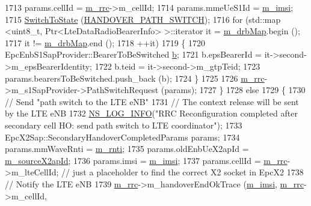 \begin{DoxyCode}
1713           params.cellId = \hyperlink{classns3_1_1UeManager_ab4405e9f354c66e7c1a4c95832290f5b}{m\_rrc}->m\_cellId;
1714           params.mmeUeS1Id = \hyperlink{classns3_1_1UeManager_a868dda076ecfc1d4202e357c16223d84}{m\_imsi};
1715           \hyperlink{classns3_1_1UeManager_af2b5ad90fc6f16ffc4a91fbe8a522472}{SwitchToState} (\hyperlink{classns3_1_1UeManager_a2f4085fdd18d7125c27da44a5b8b6808a66ee8994a912a463763b439ac0f158f2}{HANDOVER\_PATH\_SWITCH});
1716           \textcolor{keywordflow}{for} (std::map <uint8\_t, Ptr<LteDataRadioBearerInfo> >::iterator it =  
      \hyperlink{classns3_1_1UeManager_a18499c025730b63c73e5d93effff57aa}{m\_drbMap}.begin ();
1717              it != \hyperlink{classns3_1_1UeManager_a18499c025730b63c73e5d93effff57aa}{m\_drbMap}.end ();
1718              ++it)
1719           \{
1720             EpcEnbS1SapProvider::BearerToBeSwitched \hyperlink{buildings__pathloss_8m_a21ad0bd836b90d08f4cf640b4c298e7c}{b};
1721             b.epsBearerId = it->second->m\_epsBearerIdentity;
1722             b.teid =  it->second->m\_gtpTeid;
1723             params.bearersToBeSwitched.push\_back (b);
1724           \}
1725         
1726           \hyperlink{classns3_1_1UeManager_ab4405e9f354c66e7c1a4c95832290f5b}{m\_rrc}->m\_s1SapProvider->PathSwitchRequest (params);
1727         \}
1728         \textcolor{keywordflow}{else}
1729         \{
1730           \textcolor{comment}{// Send "path switch to the LTE eNB"}
1731           \textcolor{comment}{// The context release will be sent by the LTE eNB}
1732           \hyperlink{group__logging_gafbd73ee2cf9f26b319f49086d8e860fb}{NS\_LOG\_INFO}(\textcolor{stringliteral}{"RRC Reconfiguration completed after secondary cell HO: send path switch
       to LTE coordinator"});
1733           EpcX2Sap::SecondaryHandoverCompletedParams params;
1734           params.mmWaveRnti = \hyperlink{classns3_1_1UeManager_a5a72b4fe818f21993bd7f05d7e2c4f83}{m\_rnti};
1735           params.oldEnbUeX2apId = \hyperlink{classns3_1_1UeManager_aec435692a673cd55353a2bb258d5f487}{m\_sourceX2apId};
1736           params.imsi = \hyperlink{classns3_1_1UeManager_a868dda076ecfc1d4202e357c16223d84}{m\_imsi};
1737           params.cellId = \hyperlink{classns3_1_1UeManager_ab4405e9f354c66e7c1a4c95832290f5b}{m\_rrc}->m\_lteCellId; \textcolor{comment}{// just a placeholder to find the correct X2 socket in
       EpcX2}
1738           \textcolor{comment}{// Notify the LTE eNB}
1739           \hyperlink{classns3_1_1UeManager_ab4405e9f354c66e7c1a4c95832290f5b}{m\_rrc}->m\_handoverEndOkTrace (\hyperlink{classns3_1_1UeManager_a868dda076ecfc1d4202e357c16223d84}{m\_imsi}, \hyperlink{classns3_1_1UeManager_ab4405e9f354c66e7c1a4c95832290f5b}{m\_rrc}->m\_cellId, 

\end{DoxyCode}
